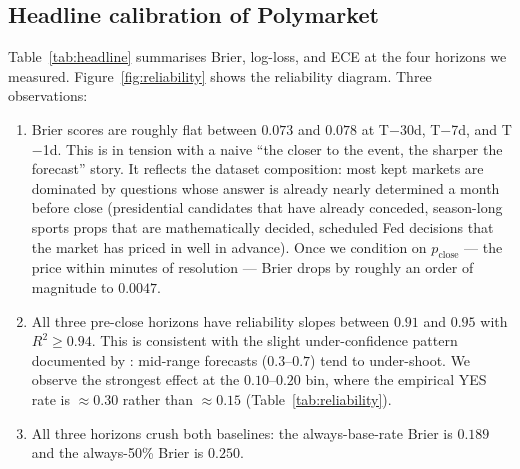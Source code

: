 \documentclass{article}
\begin{document}
\subsection{Headline calibration of Polymarket}

Table~\ref{tab:headline} summarises Brier, log-loss, and ECE at the
four horizons we measured. Figure~\ref{fig:reliability} shows the
reliability diagram. Three observations:

\begin{enumerate}
\item Brier scores are roughly flat between $0.073$ and $0.078$ at
      T$-$30d, T$-$7d, and T$-$1d. This is in tension with a naive
      ``the closer to the event, the sharper the forecast'' story.
      It reflects the dataset composition: most kept markets are
      dominated by questions whose answer is already nearly determined
      a month before close (presidential candidates that have already
      conceded, season-long sports props that are mathematically
      decided, scheduled Fed decisions that the market has priced in
      well in advance). Once we condition on $p_{\mathrm{close}}$ ---
      the price within minutes of resolution --- Brier drops by
      roughly an order of magnitude to $0.0047$.
\item All three pre-close horizons have reliability slopes between
      $0.91$ and $0.95$ with $R^2 \ge 0.94$. This is consistent with
      the slight under-confidence pattern documented by
      \citet{page2013}: mid-range forecasts ($0.3$--$0.7$) tend to
      under-shoot. We observe the strongest effect at the
      $0.10$--$0.20$ bin, where the empirical YES rate is
      $\approx 0.30$ rather than $\approx 0.15$
      (Table~\ref{tab:reliability}).
\item All three horizons crush both baselines: the always-base-rate
      Brier is $0.189$ and the always-50\% Brier is $0.250$.
\end{enumerate}
\end{document}
